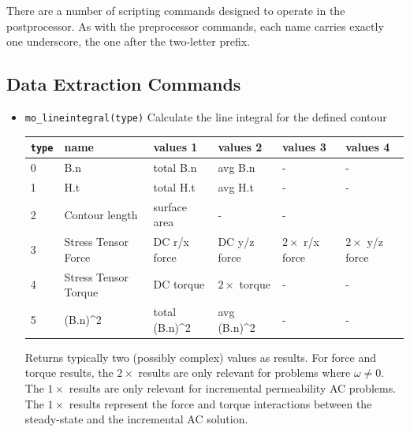There are a number of scripting commands designed to operate in
the postprocessor.  As with the preprocessor commands, each name
carries exactly one underscore, the one after the two-letter prefix.

\subsection{Data Extraction Commands}

\begin{itemize}
\item{\tt mo\_lineintegral(type)} Calculate the line integral for the defined contour
\begin{small}\begin{center}
\begin{tabular}{llllll}\hline
 {\tt type} & name & values 1 & values 2 & values 3 & values 4 \\  \hline
 0 & B.n & total B.n & avg B.n & - & -\\
 1 & H.t & total H.t & avg H.t & - & - \\
 2 & Contour length & surface area & - & -\\
 3 & Stress Tensor Force & DC r/x force & DC y/z force & $2\times$ r/x force & $2\times$ y/z force \\
 4 & Stress Tensor Torque& DC torque & $2\times$ torque & - & - \\
 5 & (B.n)\^{}2 & total (B.n)\^{}2 & avg (B.n)\^{}2 & - & - \\ \hline
\end{tabular}
\end{center}
\end{small}
Returns typically two (possibly complex) values as results. For force
and torque results, the $2\times$ results are only relevant for
problems where $\omega \neq 0$.  The $1\times$ results are only relevant
for incremental permeability AC problems.  The $1\times$ results represent
the force and torque interactions between the steady-state and the
incremental AC solution.


\end{itemize}
